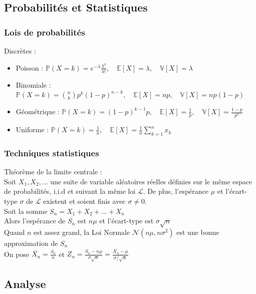 \documentclass[8pt]{article}
\begin{document}
        \subsection{Probabilités et Statistiques}
            \subsubsection{Lois de probabilités}
            Discrètes :
                \begin{itemize}
                    \item Poisson : $\mathbb{P} (X=k) = e^{-\lambda}\frac{\lambda^k}{k!}, \quad \mathbb{E}[X]=\lambda, \quad \mathbb{V}[X]=\lambda$
                    \item Binomiale : $\mathbb{P}(X=k) = \binom{n}{k} p^k (1-p)^{n-k}, \quad \mathbb{E}[X] = np, \quad \mathbb{V}[X] = np(1-p)$
                    \item Géométrique : $\mathbb{P}(X=k) = (1-p)^{k-1}p, \quad \mathbb{E}[X] = \frac{1}{p}, \quad \mathbb{V}[X] = \frac{1-p}{p^{2}}$
                    \item Uniforme : $\mathbb{P}(X=k) = \frac{1}{n}, \quad \mathbb{E}[X] = \frac{1}{n}  \sum^{n}_{k=1} x_k$
                \end{itemize}
            \subsubsection{Techniques statistiques}
            Théorème de la limite centrale : \\
            Soit $X_1,X_2,...$ une suite de variable aléatoires réelles définies sur le même espace de probabilités, i.i.d et suivant la même loi $\mathcal{L}$.
            De plus, l'espérance $\mu$ et l'écart-type $\sigma$ de $\mathcal{L}$ existent et soient finis avec $\sigma \neq 0$.\\
            Soit la somme $S_n = X_1 + X_2 + ... + X_n$\\
            Alors l'espérance de $S_n$ est $n\mu$ et l'écart-type est $\sigma \sqrt{n}$\\
            Quand $n$ est assez grand, la Loi Normale $\mathcal{N}(n\mu,n\sigma^{2})$ est une bonne approximation de $S_n$\\
            On pose $\overline{X_n} = \frac{S_n}{n}$ et $Z_n = \frac{S_n-n\mu}{\sigma \sqrt{n}} = \frac{\overline{X_n}-\mu}{\sigma / \sqrt{n}}$
        \subsection{Analyse}
\end{document}

